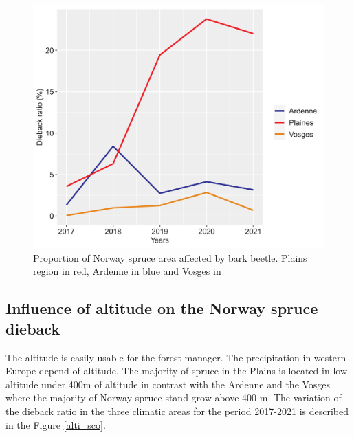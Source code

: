 \documentclass[3p,procedia]{elsarticle}
\begin{document}
\begin{figure}[htbp] 
   \centering
   \includegraphics[width=0.6 \textwidth]{Annual_evol_Ardennes_vosges_plaines.png}
    \caption{Proportion of Norway spruce area affected by bark beetle. Plains region in red, Ardenne in blue and Vosges in }
    \label{evol_gen}
\end{figure}

    


\subsection{ Influence of altitude on the Norway spruce dieback}
The altitude is easily usable for the forest manager.
The precipitation in western Europe depend of altitude. 
The majority of spruce in the Plains is located in low altitude under 400m of altitude in contrast with the Ardenne and the Vosges where the majority of Norway spruce stand grow above 400 m. 
The variation of the dieback ratio in the three climatic areas for the period 2017-2021 is described in the Figure \ref{alti_sco}.
\end{document}
